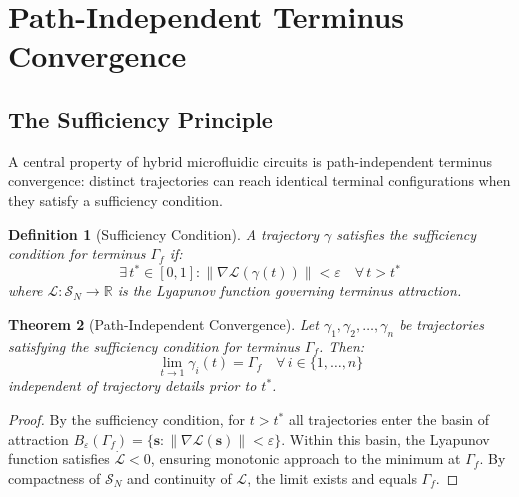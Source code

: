 \documentclass[aps,prl,twocolumn,superscriptaddress,showpacs]{revtex4-2}
\newtheorem{theorem}{Theorem}[section]
\newtheorem{definition}[theorem]{Definition}
\newcommand{\Sspace}{\mathcal{S}}
\newcommand{\traj}{\gamma}
\newcommand{\term}{\Gamma}
\begin{document}
\section{Path-Independent Terminus Convergence}
\label{sec:convergence}

\subsection{The Sufficiency Principle}

A central property of hybrid microfluidic circuits is path-independent terminus convergence: distinct trajectories can reach identical terminal configurations when they satisfy a sufficiency condition.

\begin{definition}[Sufficiency Condition]
A trajectory $\traj$ satisfies the sufficiency condition for terminus $\term_f$ if:
\begin{equation}
\exists\, t^* \in [0,1] : \|\nabla \mathcal{L}(\traj(t))\| < \varepsilon \quad \forall\, t > t^*
\end{equation}
where $\mathcal{L}: \Sspace_N \to \mathbb{R}$ is the Lyapunov function governing terminus attraction.
\end{definition}

\begin{theorem}[Path-Independent Convergence]
\label{thm:convergence}
Let $\traj_1, \traj_2, \ldots, \traj_n$ be trajectories satisfying the sufficiency condition for terminus $\term_f$. Then:
\begin{equation}
\lim_{t \to 1} \traj_i(t) = \term_f \quad \forall\, i \in \{1, \ldots, n\}
\end{equation}
independent of trajectory details prior to $t^*$.
\end{theorem}

\begin{proof}
By the sufficiency condition, for $t > t^*$ all trajectories enter the basin of attraction $B_\varepsilon(\term_f) = \{\mathbf{s} : \|\nabla \mathcal{L}(\mathbf{s})\| < \varepsilon\}$. Within this basin, the Lyapunov function satisfies $\dot{\mathcal{L}} < 0$, ensuring monotonic approach to the minimum at $\term_f$. By compactness of $\Sspace_N$ and continuity of $\mathcal{L}$, the limit exists and equals $\term_f$.
\end{proof}
\end{document}
